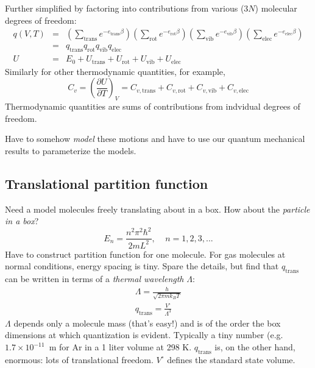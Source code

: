 \documentclass[11pt]{article}
\begin{document}
Further simplified by factoring into contributions from various ($3N$) molecular
degrees of freedom:
\begin{eqnarray}
  q(V,T)&=&\left(\sum_\mathrm{trans}
    e^{-e_\mathrm{trans}\beta}\right) \left(\sum_\mathrm{rot} 
  e^{-e_\mathrm{rot}\beta}\right) \left( \sum_\mathrm{vib}
  e^{-e_\mathrm{vib}\beta} \right) \left( \sum_\mathrm{elec}
  e^{-e_\mathrm{elec}\beta}\right) \\
&=& q_\mathrm{trans}q_\mathrm{rot}q_\mathrm{vib}q_\mathrm{elec} \\
U & = & E_0 + U_\mathrm{trans}+U_\mathrm{rot}+U_\mathrm{vib}+U_\mathrm{elec} 
\end{eqnarray}
Similarly for other thermodynamic quantities, for example,
\begin{equation}
  C_v=\left(\frac{\partial U}{\partial T}\right)_V = C_{v,\mathrm{trans}}+C_{v,\mathrm{rot}}+C_{v,\mathrm{vib}}+C_{v,\mathrm{elec}}
\end{equation}
Thermodynamic quantities are sums of contributions from indvidual degrees of
freedom.

Have to somehow {\em model} these motions and have to use our quantum
mechanical results to parameterize the models.

\subsection{Translational partition function}
Need a model molecules freely translating about in a box.  How about the
{\em particle in a box}?
\begin{equation}
  E_n=\frac{n^2\pi^2\hbar^2}{2 m L^2},~~~~~n=1,2,3,...
\end{equation}
Have to construct partition function for one molecule.  For gas molecules at
normal conditions, energy spacing is tiny.  Spare the details, but find that
$q_\mathrm{trans}$ can be written in terms of a {\em thermal wavelength}
$\Lambda$:
\begin{eqnarray}
  \Lambda=\frac{h}{\sqrt{2\pi m k_B T}} \\
q_\mathrm{trans}=\frac{V^\circ}{\Lambda^3}
\end{eqnarray}
$\Lambda$ depends only a molecule mass (that's easy!) and is of the order the
box dimensions at which quantization is evident.  Typically a tiny number
(e.g. $1.7\times 10^{-11}$~m for Ar in a 1 liter volume at 298 K.
$q_\mathrm{trans}$ is, on the other hand, enormous: lots of translational
freedom.  $V^\circ$ defines the standard state volume.
\end{document}
